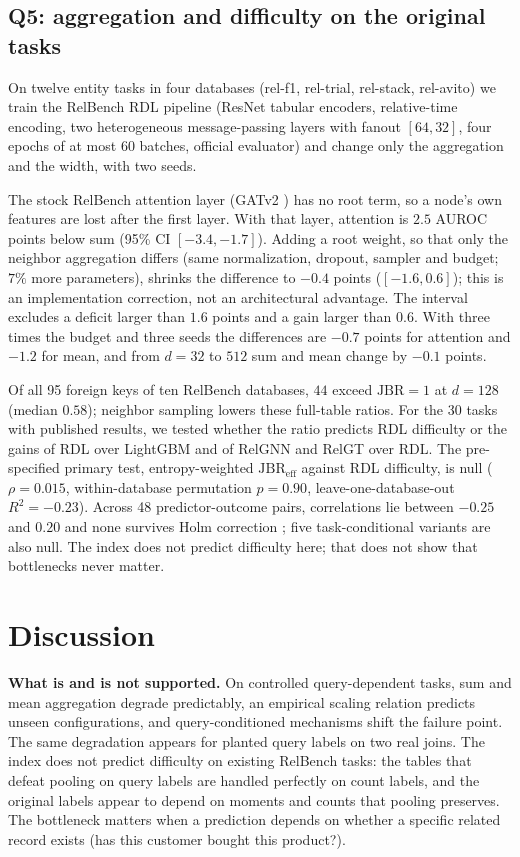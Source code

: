 \documentclass[conference]{IEEEtran}
\newcommand{\jbr}{\mathrm{JBR}}
\begin{document}
\subsection{Q5: aggregation and difficulty on the original tasks}
\label{sec:real}

On twelve entity tasks in four databases (rel-f1, rel-trial, rel-stack, rel-avito) we train the RelBench RDL pipeline (ResNet tabular encoders, relative-time encoding, two heterogeneous message-passing layers with fanout $[64, 32]$, four epochs of at most 60 batches, official evaluator) and change only the aggregation and the width, with two seeds.

The stock RelBench attention layer (GATv2 \cite{brody2022gatv2}) has no root term, so a node's own features are lost after the first layer. With that layer, attention is $2.5$ AUROC points below sum (95\% CI $[-3.4, -1.7]$). Adding a root weight, so that only the neighbor aggregation differs (same normalization, dropout, sampler and budget; $7\%$ more parameters), shrinks the difference to $-0.4$ points ($[-1.6, 0.6]$); this is an implementation correction, not an architectural advantage. The interval excludes a deficit larger than $1.6$ points and a gain larger than $0.6$. With three times the budget and three seeds the differences are $-0.7$ points for attention and $-1.2$ for mean, and from $d = 32$ to $512$ sum and mean change by $-0.1$ points.

Of all 95 foreign keys of ten RelBench databases, $44$ exceed $\jbr = 1$ at $d = 128$ (median $0.58$); neighbor sampling lowers these full-table ratios. For the 30 tasks with published results, we tested whether the ratio predicts RDL difficulty or the gains of RDL over LightGBM \cite{robinson2024relbench} and of RelGNN \cite{chen2025relgnn} and RelGT \cite{dwivedi2025relgt} over RDL. The pre-specified primary test, entropy-weighted $\jbr_{\mathrm{eff}}$ against RDL difficulty, is null ($\rho = 0.015$, within-database permutation $p = 0.90$, leave-one-database-out $R^2 = -0.23$). Across 48 predictor-outcome pairs, correlations lie between $-0.25$ and $0.20$ and none survives Holm correction \cite{holm1979}; five task-conditional variants are also null. The index does not predict difficulty here; that does not show that bottlenecks never matter.

\section{Discussion}

\textbf{What is and is not supported.} On controlled query-dependent tasks, sum and mean aggregation degrade predictably, an empirical scaling relation predicts unseen configurations, and query-conditioned mechanisms shift the failure point. The same degradation appears for planted query labels on two real joins. The index does not predict difficulty on existing RelBench tasks: the tables that defeat pooling on query labels are handled perfectly on count labels, and the original labels appear to depend on moments and counts that pooling preserves. The bottleneck matters when a prediction depends on whether a specific related record exists (has this customer bought this product?).
\end{document}

